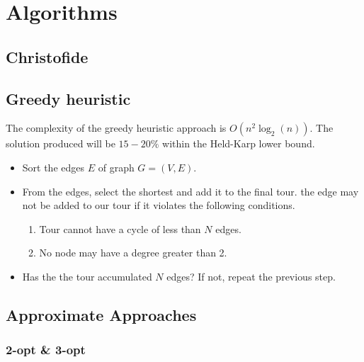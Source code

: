 \documentclass[margin=5mm]{standalone}
\begin{document}
  \section{Algorithms}

  \subsection{Christofide}

  \subsection{Greedy heuristic}
    The complexity of the greedy heuristic approach  is $O(n^2\log_2(n))$. The
    solution produced will be $15-20\%$ within the Held-Karp lower bound.

    \begin{itemize}
      \item Sort the edges $E$ of graph $G=(V,E)$.
      \item From the edges, select the shortest and add it to the final tour.
            the edge may not be added to our tour if it violates the following
            conditions.

            \begin{enumerate}
              \item Tour cannot have a cycle of less than $N$ edges.
              \item No node may have a degree greater than 2.
            \end{enumerate}
      \item Has the the tour accumulated $N$ edges? If not, repeat the previous
            step.
    \end{itemize}
    
  \subsection{Approximate Approaches}

  \subsubsection{2-opt & 3-opt}

  \subsubsection{}
\end{document}
